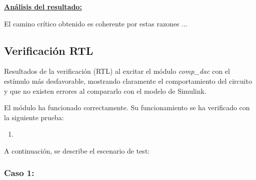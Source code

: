 \documentclass[parskip,a4paper,12pt]{article}
\newcommand{\fila}{}
\begin{document}

\def\colUNO{3cm}
\def\colDOS{12cm}

\begin{table}[H]
    \caption{Frecuencia de reloj y camino crítico del \emph{comp\_dac}}
    \label{tab:frec_clk}
\gdef\cabecera{\fila{$f_{clk} $ (MHz)}{CAMINO CRÍTICO}}
\noindent\begin{mitabla}
\fila{}{} 
\end{mitabla}
\end{table}

\underline{\textbf{Análisis del resultado:}}

El camino crítico obtenido es coherente por estas razones ...
\subsection{Verificación RTL}
\begin{enunciado}{}{}%
Resultados de la verificación (RTL) al excitar el módulo \emph{comp\_dac} con el estímulo más desfavorable, mostrando claramente el comportamiento del circuito y que no existen errores al compararlo con el modelo de Simulink.  

\end{enunciado}

El módulo ha funcionado correctamente. Su funcionamiento se ha verificado con la siguiente prueba:
\begin{enumerate}
    \item 
\end{enumerate}

A continuación, se describe el escenario de test:
\subsubsection{Caso 1: }



\end{document}
